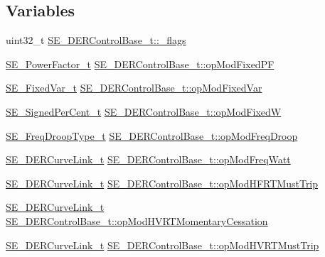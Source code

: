 \subsection*{Variables}
\begin{DoxyCompactItemize}
\item 
uint32\+\_\+t \hyperlink{group__DERControlBase_gaf48e1f28d437a79aba1ac66fb63ca37f}{S\+E\+\_\+\+D\+E\+R\+Control\+Base\+\_\+t\+::\+\_\+flags}
\item 
\hyperlink{structSE__PowerFactor__t}{S\+E\+\_\+\+Power\+Factor\+\_\+t} \hyperlink{group__DERControlBase_ga1bf6e505bc8ec7cd081352a3c451f04a}{S\+E\+\_\+\+D\+E\+R\+Control\+Base\+\_\+t\+::op\+Mod\+Fixed\+PF}
\item 
\hyperlink{structSE__FixedVar__t}{S\+E\+\_\+\+Fixed\+Var\+\_\+t} \hyperlink{group__DERControlBase_ga4adf111637bfacae44bdc13b01705a22}{S\+E\+\_\+\+D\+E\+R\+Control\+Base\+\_\+t\+::op\+Mod\+Fixed\+Var}
\item 
\hyperlink{group__SignedPerCent_ga3a844f23440f7c1756032f6ef2359fdf}{S\+E\+\_\+\+Signed\+Per\+Cent\+\_\+t} \hyperlink{group__DERControlBase_ga14d4dc75a71ba474a05b997aae88e069}{S\+E\+\_\+\+D\+E\+R\+Control\+Base\+\_\+t\+::op\+Mod\+FixedW}
\item 
\hyperlink{structSE__FreqDroopType__t}{S\+E\+\_\+\+Freq\+Droop\+Type\+\_\+t} \hyperlink{group__DERControlBase_gae6d51c07133aedc89b90801e45e86cc1}{S\+E\+\_\+\+D\+E\+R\+Control\+Base\+\_\+t\+::op\+Mod\+Freq\+Droop}
\item 
\hyperlink{structSE__DERCurveLink__t}{S\+E\+\_\+\+D\+E\+R\+Curve\+Link\+\_\+t} \hyperlink{group__DERControlBase_ga78557963030045b7549535be8003bb1b}{S\+E\+\_\+\+D\+E\+R\+Control\+Base\+\_\+t\+::op\+Mod\+Freq\+Watt}
\item 
\hyperlink{structSE__DERCurveLink__t}{S\+E\+\_\+\+D\+E\+R\+Curve\+Link\+\_\+t} \hyperlink{group__DERControlBase_gaef9f47c883d5d5396d782f0302bf77b7}{S\+E\+\_\+\+D\+E\+R\+Control\+Base\+\_\+t\+::op\+Mod\+H\+F\+R\+T\+Must\+Trip}
\item 
\hyperlink{structSE__DERCurveLink__t}{S\+E\+\_\+\+D\+E\+R\+Curve\+Link\+\_\+t} \hyperlink{group__DERControlBase_gafe0a7951692bbd4f45dfb6c59a621b0c}{S\+E\+\_\+\+D\+E\+R\+Control\+Base\+\_\+t\+::op\+Mod\+H\+V\+R\+T\+Momentary\+Cessation}
\item 
\hyperlink{structSE__DERCurveLink__t}{S\+E\+\_\+\+D\+E\+R\+Curve\+Link\+\_\+t} \hyperlink{group__DERControlBase_ga6117ce2942b55045220c21fc407bae79}{S\+E\+\_\+\+D\+E\+R\+Control\+Base\+\_\+t\+::op\+Mod\+H\+V\+R\+T\+Must\+Trip}
\item 

\end{DoxyCompactItemize}
